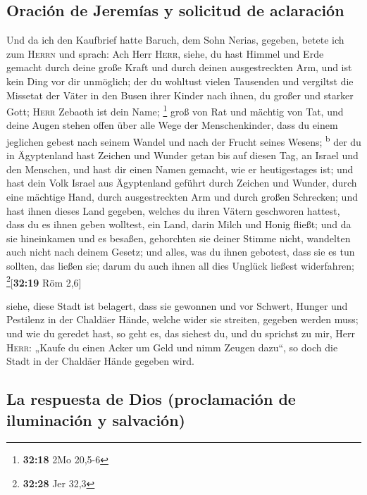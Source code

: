 \hypertarget{oraciuxf3n-de-jeremuxedas-y-solicitud-de-aclaraciuxf3n}{%
\subsection{Oración de Jeremías y solicitud de
aclaración}\label{oraciuxf3n-de-jeremuxedas-y-solicitud-de-aclaraciuxf3n}}

 Und da ich den Kaufbrief hatte Baruch, dem Sohn Nerias,
gegeben, betete ich zum \textsc{Herrn} und sprach:  Ach
Herr \textsc{Herr}, siehe, du hast Himmel und Erde gemacht durch deine
große Kraft und durch deinen ausgestreckten Arm, und ist kein Ding vor
dir unmöglich;  der du wohltust vielen Tausenden und
vergiltst die Missetat der Väter in den Busen ihrer Kinder nach ihnen,
du großer und starker Gott; \textsc{Herr} Zebaoth ist dein Name;
\footnote{\textbf{32:18} 2Mo 20,5-6}  groß von Rat und
mächtig von Tat, und deine Augen stehen offen über alle Wege der
Menschenkinder, dass du einem jeglichen gebest nach seinem Wandel und
nach der Frucht seines Wesens; \textsuperscript{b}  der
du in Ägyptenland hast Zeichen und Wunder getan bis auf diesen Tag, an
Israel und den Menschen, und hast dir einen Namen gemacht, wie er
heutigestages ist;  und hast dein Volk Israel aus
Ägyptenland geführt durch Zeichen und Wunder, durch eine mächtige Hand,
durch ausgestreckten Arm und durch großen Schrecken;  und
hast ihnen dieses Land gegeben, welches du ihren Vätern geschworen
hattest, dass du es ihnen geben wolltest, ein Land, darin Milch und
Honig fließt;  und da sie hineinkamen und es besaßen,
gehorchten sie deiner Stimme nicht, wandelten auch nicht nach deinem
Gesetz; und alles, was du ihnen gebotest, dass sie es tun sollten, das
ließen sie; darum du auch ihnen all dies Unglück ließest widerfahren;
\footnote{\textbf{32:28} Jer 32,3}{[}\textbf{32:19} Röm 2,6{]}

 siehe, diese Stadt ist belagert, dass sie gewonnen und
vor Schwert, Hunger und Pestilenz in der Chaldäer Hände, welche wider
sie streiten, gegeben werden muss; und wie du geredet hast, so geht es,
das siehest du,  und du sprichst zu mir, Herr
\textsc{Herr}: „Kaufe du einen Acker um Geld und nimm Zeugen dazu``, so
doch die Stadt in der Chaldäer Hände gegeben wird.

\hypertarget{la-respuesta-de-dios-proclamaciuxf3n-de-iluminaciuxf3n-y-salvaciuxf3n}{%
\subsection{La respuesta de Dios (proclamación de iluminación y
salvación)}\label{la-respuesta-de-dios-proclamaciuxf3n-de-iluminaciuxf3n-y-salvaciuxf3n}}


